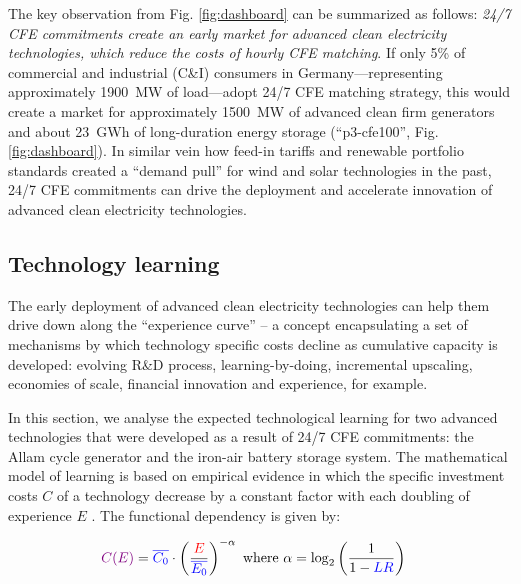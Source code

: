 \documentclass[pdflatex,sn-basic, Numbered]{sn-jnl}%
\theoremstyle{thmstyleone}%
\theoremstyle{thmstyletwo}%
\theoremstyle{thmstylethree}%
\begin{document}
The key observation from Fig. \ref{fig:dashboard} can be summarized as follows: \textit{24/7 CFE commitments create an early market for advanced clean electricity technologies, which reduce the costs of hourly CFE matching}. If only 5\% of commercial and industrial (C\&I) consumers in Germany---representing approximately 1900~MW of load---adopt 24/7 CFE matching strategy, this would create a market for approximately 1500~MW of advanced clean firm generators and about 23~GWh of long-duration energy storage (\enquote{p3-cfe100}, Fig. \ref{fig:dashboard}). In similar vein how feed-in tariffs and renewable portfolio standards created a \enquote{demand pull} for wind and solar technologies in the past, 24/7 CFE commitments can drive the deployment and accelerate innovation of advanced clean electricity technologies.

\FloatBarrier
\subsection*{Technology learning}\label{sec3}

The early deployment of advanced clean electricity technologies can help them drive down along the \enquote{experience curve} -- a concept encapsulating a set of mechanisms by which technology specific costs decline as cumulative capacity is developed: evolving R\&D process, learning-by-doing, incremental upscaling, economies of scale, financial innovation and experience, for example.

In this section, we analyse the expected technological learning for two advanced technologies that were developed as a result of 24/7 CFE commitments: the Allam cycle generator and the iron-air battery storage system. The mathematical model of learning is based on empirical evidence in which the speciﬁc investment costs $C$ of a technology decrease by a constant factor with each doubling of experience $E$ \cite{wayEmpiricallyGroundedTechnology2022a}. The functional dependency is given by:

\begin{equation}
  \begin{aligned}
    \color{violet}C(E)\color{black} &= \color{blue}\overline{C_0}\color{black}  \cdot \left( \frac{\color{red}E}{\color{blue}\overline{E_0}\color{black}} \right)^{-\color{black}\alpha} \text{ where } \color{black}\alpha = \color{black}\log_2 \left( \frac{1}{1 - \color{blue}LR\color{black}} \right)
    \label{eq:learning_curve}
  \end{aligned}
\end{equation}
\end{document}
